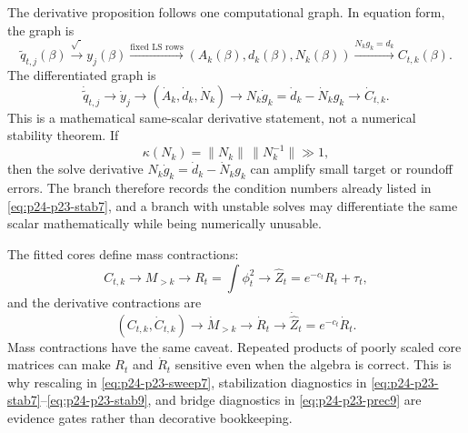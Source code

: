 \documentclass[11pt]{article}
\begin{document}
The derivative proposition follows one computational graph.  In equation form,
the graph is
\[
    \widetilde q_{t,j}(\beta)
    \xrightarrow{\sqrt{\cdot}}
    y_j(\beta)
    \xrightarrow{\text{fixed LS rows}}
    (A_k(\beta),d_k(\beta),N_k(\beta))
    \xrightarrow{N_kg_k=d_k}
    C_{t,k}(\beta).
    \label{eq:p24-p23-gdag1}
\]
The differentiated graph is
\[
    \dot{\widetilde q}_{t,j}
    \to
    \dot y_j
    \to
    (\dot A_k,\dot d_k,\dot N_k)
    \to
    N_k\dot g_k=\dot d_k-\dot N_k g_k
    \to
    \dot C_{t,k}.
    \label{eq:p24-p23-gdag2}
\]
This is a mathematical same-scalar derivative statement, not a numerical
stability theorem.  If
\[
    \kappa(N_k)
    =
    \|N_k\|\,\|N_k^{-1}\|
    \gg 1,
    \label{eq:p24-p23-gdag2a}
\]
then the solve derivative
\(N_k\dot g_k=\dot d_k-\dot N_kg_k\) can amplify small target or roundoff
errors.  The branch therefore records the condition numbers already listed in
\eqref{eq:p24-p23-stab7}, and a branch with unstable solves may differentiate the same
scalar mathematically while being numerically unusable.

The fitted cores define mass contractions:
\[
    C_{t,k}
    \to
    M_{>k}
    \to
    R_t=\int\phi_t^2
    \to
    \widehat Z_t=e^{-c_t}R_t+\tau_t,
    \label{eq:p24-p23-gdag3}
\]
and the derivative contractions are
\[
    (C_{t,k},\dot C_{t,k})
    \to
    \dot M_{>k}
    \to
    \dot R_t
    \to
    \dot{\widehat Z}_t=e^{-c_t}\dot R_t.
    \label{eq:p24-p23-gdag4}
\]
Mass contractions have the same caveat.  Repeated products of poorly scaled
core matrices can make \(R_t\) and \(\dot R_t\) sensitive even when the algebra
is correct.  This is why rescaling in \eqref{eq:p24-p23-sweep7}, stabilization diagnostics
in \eqref{eq:p24-p23-stab7}--\eqref{eq:p24-p23-stab9}, and bridge diagnostics in \eqref{eq:p24-p23-prec9} are
evidence gates rather than decorative bookkeeping.
\end{document}
